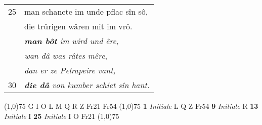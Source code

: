 \documentclass[8pt,a4paper,notitlepage]{article}
\begin{document}
\begin{table}[ht]
\begin{minipage}[t]{0.5\linewidth}
\begin{tabular}{rl}
25 & man schancte im unde pflac sîn sô,\\ 
 & die trûrigen wâren mit im vrô.\\ 
 & \textit{\textbf{man bôt} im wird und êre,}\\ 
 & \textit{wan dâ was râtes mêre},\\ 
 & \textit{dan er ze Pelrapeire vant,}\\ 
30 & \textit{\textbf{die dâ} von kumber schiet sîn hant.}\\ 
\end{tabular}
\scriptsize
\line(1,0){75} \newline
G I O L M Q R Z Fr21 Fr54 \newline
\line(1,0){75} \newline
\textbf{1} \textit{Initiale} L Q Z Fr54  \textbf{9} \textit{Initiale} R  \textbf{13} \textit{Initiale} I  \textbf{25} \textit{Initiale} I O Fr21  \newline
\line(1,0){75} \newline

\end{minipage}
\end{table}
\end{document}
